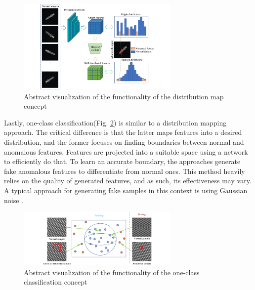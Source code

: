 \begin{figure}[H]
\centering
\includegraphics[width=0.7\textwidth]{figures/approachvizgeneral/distmapviz.jpg}
\caption{Abstract visualization of the functionality of the distribution map concept \cite{liu2024deep}}
\label{fig:distmapviz}
\end{figure}

Lastly, one-class classification(Fig. \ref{fig:OCCviz}) is 
similar to a distribution mapping approach. The critical difference is that the latter maps features into a desired distribution, and the former focuses on finding boundaries between normal 
and anomalous features. Features are projected into a suitable space using a network to efficiently do that. To learn an accurate boundary, the approaches generate fake anomalous features to 
differentiate from normal ones. This method heavily relies on the quality of generated features, and as such, its effectiveness may vary. A typical approach for generating fake samples 
in this context is using Gaussian noise \cite{liu2023simplenet}.

\begin{figure}[H]
\centering
\includegraphics[width=0.7\textwidth]{figures/approachvizgeneral/OCCviz.jpg}
\caption{Abstract visualization of the functionality of the one-class classification concept \cite{liu2024deep}}
\label{fig:OCCviz}
\end{figure}


